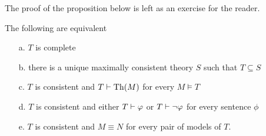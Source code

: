 The proof of the proposition below is left as an exercise for the reader.

\begin{proposition}\label{fattoconsistenzasensolato}
The following are equivalent
\begin{itemize}
\item[a.] $T$ is complete
\item[b.] there is a unique maximally consistent theory $S$ such that $T\subseteq S$
\item[c.] $T$ is consistent and $T\vdash{\rm Th}(M)$ for every $M\models T$
\item[d.] $T$ is consistent and either $T\vdash\varphi$ or $T\vdash\neg\varphi$ for every sentence $\phi$
\item[e.] $T$ is consistent and $M\equiv N$ for every pair of models of $T$.
\end{itemize}
\end{proposition}
